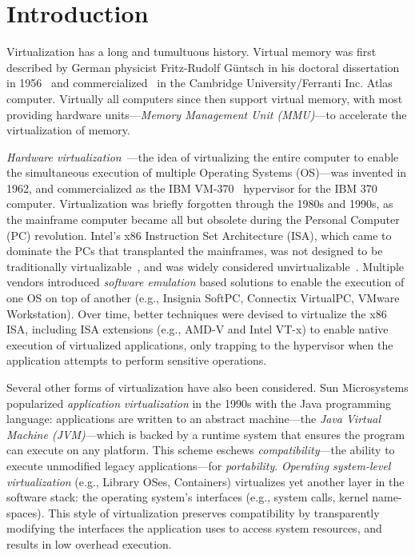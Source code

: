 \chapter{Introduction}
\label{sec:intro}

Virtualization has a long and tumultuous history. Virtual memory was first
described by German physicist Fritz-Rudolf Güntsch in his doctoral
dissertation in 1956~\cite{virtual-memory} and commercialized~\cite{atlas-vm}
in the Cambridge University/Ferranti Inc. Atlas computer. Virtually all
computers since then support virtual memory, with most providing hardware
units---\emph{Memory Management Unit (MMU)}---to accelerate the virtualization
of memory.

\emph{Hardware virtualization}~\cite{cp40}---the idea of virtualizing the
entire computer to enable the simultaneous execution of multiple Operating
Systems (OS)---was invented in 1962, and commercialized as the IBM
VM-370~\cite{vm370} hypervisor for the IBM 370 computer.
Virtualization was briefly forgotten through the 1980s and 1990s, as the
mainframe computer became all but obsolete during the Personal Computer (PC)
revolution. Intel's x86 Instruction Set Architecture (ISA), which came to
dominate the PCs that transplanted the mainframes, was not designed to be
traditionally virtualizable~\cite{popek-goldberg}, and was widely considered
unvirtualizable~\cite{gelsinger-pc,bugnion-workstation}. Multiple vendors
introduced \emph{software emulation} based solutions to enable the execution
of one OS on top of another (e.g., Insignia SoftPC, Connectix VirtualPC,
VMware Workstation). Over time, better techniques were devised to virtualize
the x86 ISA, including ISA extensions (e.g., AMD-V and Intel VT-x) to enable
native execution of virtualized applications, only trapping to the hypervisor
when the application attempts to perform sensitive operations.

Several other forms of virtualization have also been considered.
Sun Microsystems popularized \emph{application virtualization} in the 1990s
with the Java programming language: applications are written to an abstract
machine---the \emph{Java Virtual Machine (JVM)}---which is backed by a runtime
system that ensures the program can execute on any platform.
This scheme eschews \emph{compatibility}---the ability to execute unmodified
legacy applications---for \emph{portability}.
\emph{Operating system-level virtualization} (e.g., Library OSes, Containers)
virtualizes yet another layer in the software stack: the operating system's
interfaces (e.g., system calls, kernel name-spaces). This style of
virtualization preserves compatibility by transparently modifying the
interfaces the application uses to access system resources, and results in
low overhead execution.

